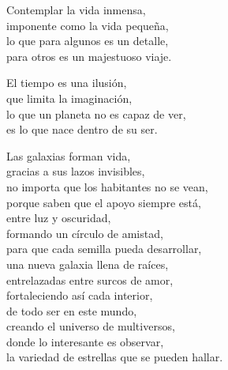 \begin{center}
\vspace{1em} 
Contemplar la vida inmensa,\\ 
imponente como la vida pequeña,\\ 
lo que para algunos es un detalle,\\ 
para otros es un majestuoso viaje.

\vspace{1em} 
El tiempo es una ilusión,\\ 
que limita la imaginación,\\ 
lo que un planeta no es capaz de ver,\\ 
es lo que nace dentro de su ser.

\vspace{1em} 
Las galaxias forman vida,\\ 
gracias a sus lazos invisibles,\\ 
no importa que los habitantes no se vean,\\ 
porque saben que el apoyo siempre está,\\ 
entre luz y oscuridad,\\ 
formando un círculo de amistad,\\ 
para que cada semilla pueda desarrollar,\\ 
una nueva galaxia llena de raíces,\\ 
entrelazadas entre surcos de amor,\\ 
fortaleciendo así cada interior,\\ 
de todo ser en este mundo,\\ 
creando el universo de multiversos,\\ 
donde lo interesante es observar,\\ 
la variedad de estrellas que se pueden hallar.


\end{center}




